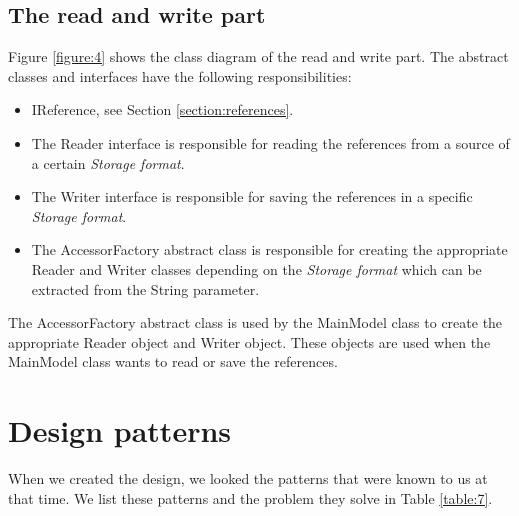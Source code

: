 \documentclass[a4paper]{article}
\begin{document}

\subsection{The read and write part} \label{section:readwrite}
Figure \ref{figure:4} shows the class diagram of the read and write part. The abstract classes and interfaces have the following responsibilities:

\begin{itemize}
	\item IReference, see Section \ref{section:references}.
	\item The Reader interface is responsible for reading the references from a source of a certain \textit{Storage format}.
	\item The Writer interface is responsible for saving the references in a specific \textit{Storage format}.
	\item The AccessorFactory abstract class is responsible for creating the appropriate Reader and Writer classes depending on the \textit{Storage format} which can be extracted from the String parameter. 
\end{itemize}

The AccessorFactory abstract class is used by the MainModel class to create the appropriate Reader object and Writer object. These objects are used when the MainModel class wants to read or save the references. 


\section{Design patterns}
When we created the design, we looked the patterns that were known to us at that time. We list these patterns and the problem they solve in Table \ref{table:7}.
\end{document}
